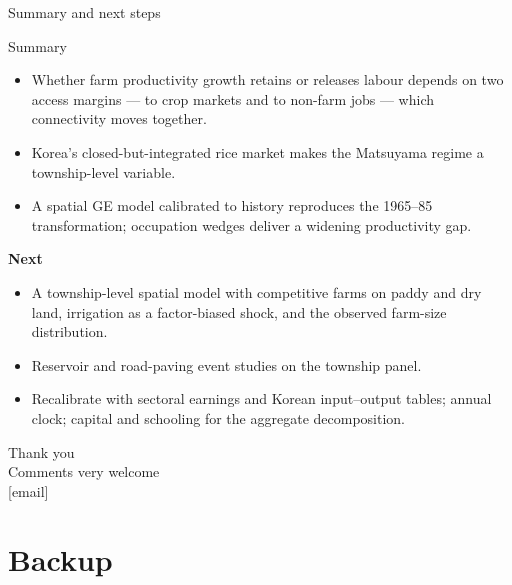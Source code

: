 \documentclass[10pt,aspectratio=169]{beamer}
\begin{document}
\begin{frame}{Summary and next steps}
  \begin{block}{Summary}
    \small
    \begin{itemize}
      \item Whether farm productivity growth retains or releases labour depends on two
            access margins --- to crop markets and to non-farm jobs --- which
            connectivity moves together.
      \item Korea's closed-but-integrated rice market makes the Matsuyama regime a
            township-level variable.
      \item A spatial GE model calibrated to history reproduces the 1965--85
            transformation; occupation wedges deliver a widening productivity gap.
    \end{itemize}
  \end{block}
  \textbf{Next}
  \begin{itemize}\footnotesize
    \item A township-level spatial model with competitive farms on paddy and dry land,
          irrigation as a factor-biased shock, and the observed farm-size distribution.
    \item Reservoir and road-paving event studies on the township panel.
    \item Recalibrate with sectoral earnings and Korean input--output tables; annual
          clock; capital and schooling for the aggregate decomposition.
  \end{itemize}
\end{frame}

\begin{frame}[standout]
  Thank you\\[0.6em]
  \normalsize Comments very welcome\\
  \small [email]
\end{frame}

\appendix
{}
\section{Backup}
\end{document}
